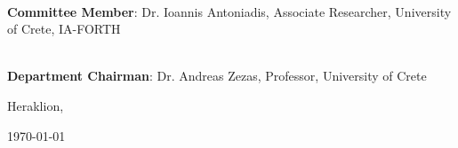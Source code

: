 \documentclass[main.tex]{subfiles}
\begin{document}
    \noindent\hrulefill \\
    \noindent\textbf{Committee Member}: Dr. Ioannis Antoniadis, Associate Researcher, University of Crete, IA-FORTH \\
    \vspace*{1cm}    
    
    \noindent\hrulefill \\
    \noindent\textbf{Department Chairman}: Dr. Andreas Zezas, Professor, University of Crete \\
    \vspace*{1cm}  
    
    \begin{center}
        \vspace*{\fill}
        Heraklion, \date{}{\today}
    \end{center}
\end{document}
